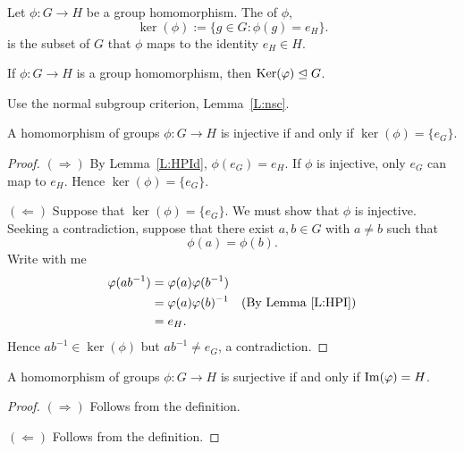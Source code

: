 \documentclass{ximera}
\begin{document}
\begin{definition}
  Let $\phi:G\to H$ be a group homomorphism. The  of
  $\phi$,
  \[
  \ker(\phi) := \{g\in G: \phi(g) = e_H\}.
  \]
  is the subset of $G$ that $\phi$ maps to the identity $e_H\in H$.
\end{definition}





\begin{lemma}\label{L:kerN}
  If $\phi:G\to H$ is a group homomorphism, then $\ker(\phi)\normal G$.
  \begin{sketch}
    Use the normal subgroup criterion, Lemma~\ref{L:nsc}.
  \end{sketch}
\end{lemma}



\begin{lemma}\label{L:kerinj}
  A homomorphism of groups $\phi:G\to H$ is injective if and only if
  $\ker(\phi) = \{e_G\}$.
  \begin{proof}
    $(\Rightarrow)$ By Lemma~\ref{L:HPId}, $\phi(e_G) = e_H$. If
    $\phi$ is injective, only $e_G$ can map to $e_H$. Hence
    $\ker(\phi) = \{e_G\}$.


    $(\Leftarrow)$ Suppose that $\ker(\phi) = \{e_G\}$. We must show
    that $\phi$ is injective. Seeking a contradiction, suppose that
    there exist $a,b\in G$ with $a\ne b$ such that
    \[
    \phi(a) = \phi(b).
    \]
    Write with me
    \begin{align*}
      \phi(ab^{-1}) &=\phi(a)\phi(b^{-1})\\
      &= \phi(a) \phi(b)^{-1} & \text{(By Lemma~\ref{L:HPI})}\\
      &= e_H.
    \end{align*}
    Hence $ab^{-1}\in\ker(\phi)$ but $ab^{-1}\ne e_G$, a
    contradiction.
  \end{proof}
\end{lemma}


\begin{lemma}
    A homomorphism of groups $\phi:G\to H$ is surjective if and only
    if $\im(\phi) = H$.
    \begin{proof}
      $(\Rightarrow)$ Follows from the definition.

      $(\Leftarrow)$ Follows from the definition.
    \end{proof}
\end{lemma}
\end{document}
